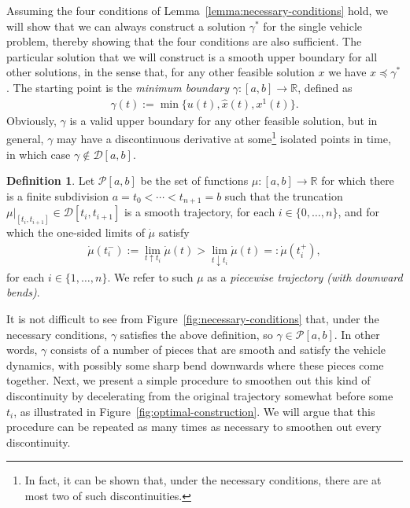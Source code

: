 \documentclass[a4paper]{article}
\theoremstyle{definition}
\newtheorem{define}{Definition\hspace{0.25em}\ignorespaces}
\theoremstyle{plain}
\begin{document}
Assuming the four conditions of Lemma~\ref{lemma:necessary-conditions} hold, we will show that we can always
construct a solution $\gamma^{*}$ for the single vehicle problem, thereby
showing that the four conditions are also sufficient.
%
The particular solution that we will construct is a smooth upper boundary for all
other solutions, in the sense that, for any other feasible solution $x$ we have
$x \preceq \gamma^{*}$.
%
The starting point is the \emph{minimum boundary} $\gamma : [a,b] \rightarrow \mathbb{R}$, defined as
\begin{align}\label{eq:min-boundary}
  \gamma(t) := \min \{ u(t), \hat{x}(t), x^{1}(t) \} .
\end{align}
%
Obviously, $\gamma$ is a valid upper boundary for any other feasible solution,
%
but in general, $\gamma$ may have a discontinuous derivative at some\footnote{In fact, it can be shown that, under the necessary conditions, there are at most two of such discontinuities.} isolated
points in time, in which case $\gamma \notin \mathcal{D}[a,b]$.

\begin{define}\label{def:piecewise-trajectory}
  Let $\mathcal{P}[a,b]$ be the set of functions $\mu : [a, b] \rightarrow \mathbb{R}$ for
  which there is a finite subdivision $a = t_{0} < \cdots < t_{n+1} = b$ such that
  the truncation $\mu|_{[t_{i}, t_{i+1}]} \in \mathcal{D}[t_{i}, t_{i+1}]$ is
  a smooth trajectory, for each $i \in \{0, \dots, n\}$, and for which the one-sided limits of $\dot{\mu}$ satisfy
  \begin{align}
    \dot{\mu}(t_{i}^{-}) := \lim_{t \uparrow t_{i}} \dot{\mu}(t) > \lim_{t \downarrow t_{i}} \dot{\mu}(t) =: \dot{\mu}(t_{i}^{+}) ,
  \end{align}
  for each $i \in \{1, \dots, n\}$. We refer to such $\mu$ as a \emph{piecewise
    trajectory (with downward bends)}.
\end{define}

It is not difficult to see from Figure~\ref{fig:necessary-conditions} that,
under the necessary conditions, $\gamma$ satisfies the above definition, so
$\gamma \in \mathcal{P}[a,b]$. In other words, $\gamma$ consists of a number of
pieces that are smooth and satisfy the vehicle dynamics, with possibly some
sharp bend downwards where these pieces come together.
%
Next, we present a simple procedure to smoothen out this kind of discontinuity
by decelerating from the original trajectory somewhat before some $t_{i}$, as
illustrated in Figure~\ref{fig:optimal-construction}. We will argue that this procedure can be repeated as
many times as necessary to smoothen out every discontinuity.
\end{document}
